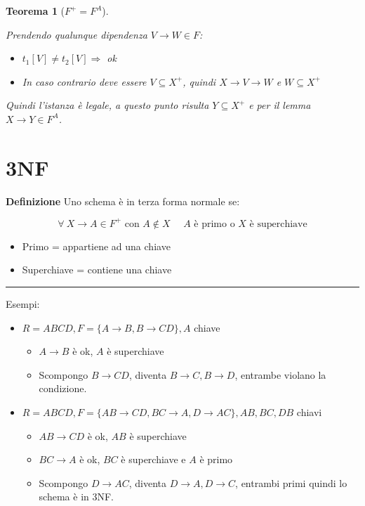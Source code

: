 \documentclass{article}
\newtheorem{theorem}{Teorema}
\begin{document}
\begin{theorem}[$F^+=F^A$]
\begin{itemize}
        Prendendo qualunque dipendenza $V\rightarrow W\in F$:
        \begin{itemize}
            \item $t_1[V]\neq t_2[V]\Rightarrow$ ok
            \item In caso contrario deve essere $V\subseteq X^+$, quindi $X\rightarrow V \rightarrow W$ e $W\subseteq X^+$\newline
        \end{itemize}

        Quindi l'istanza è legale, a questo punto risulta $Y\subseteq X^+$ e per il lemma $X\rightarrow Y\in F^A$.\newline
        
    \end{itemize}
\end{theorem}

\section{3NF}

\textbf{Definizione} Uno schema è in terza forma normale se:

$$\forall\ X\rightarrow A\in F^+\text{ con }A\notin X\ \ \ \text{ $A$ è primo o $X$ è superchiave}$$\vspace{5pt}

\begin{itemize}
    \item Primo = appartiene ad una chiave
    \item Superchiave = contiene una chiave
\end{itemize}

\noindent\rule{\textwidth}{0.5pt}

\noindent Esempi:
\begin{itemize}
    \item $R=ABCD,F=\{A\rightarrow B,B\rightarrow CD\},A$ chiave
        \begin{itemize}
            \item $A\rightarrow B$ è ok, $A$ è superchiave
            \item Scompongo $B\rightarrow CD$, diventa $B\rightarrow C,B\rightarrow D$, entrambe violano la condizione.
            
        \end{itemize}

    \item $R=ABCD,F=\{AB\rightarrow CD,BC\rightarrow A,D\rightarrow AC\},AB,BC,DB$ chiavi
        \begin{itemize}
            \item $AB\rightarrow CD$ è ok, $AB$ è superchiave
            \item $BC\rightarrow A$ è ok, $BC$ è superchiave e $A$ è primo
            \item Scompongo $D\rightarrow AC$, diventa $D\rightarrow A,D\rightarrow C$, entrambi primi quindi lo schema è in 3NF.
            
        \end{itemize}
        
\end{itemize}
\end{document}
